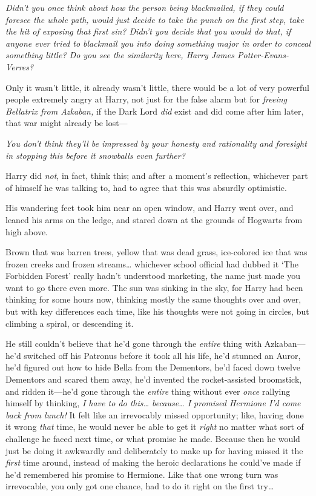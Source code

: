 \emph{Didn't you once think about how the person being blackmailed, if
they could foresee the whole path, would just decide to take the punch
on the first step, take the hit of exposing that first sin? Didn't you
decide that you would do that, if anyone ever tried to blackmail you
into doing something major in order to conceal something little? Do you
see the similarity here, Harry James Potter-Evans-Verres?}

Only it wasn't little, it already wasn't little, there would be a lot of
very powerful people extremely angry at Harry, not just for the false
alarm but for \emph{freeing Bellatrix from Azkaban,} if the Dark Lord
\emph{did} exist and did come after him later, that war might already be
lost---

\emph{You don't think they'll be impressed by your honesty and
rationality and foresight in stopping this before it snowballs even
further?}

Harry did \emph{not}, in fact, think this; and after a moment's
reflection, whichever part of himself he was talking to, had to agree
that this was absurdly optimistic.

His wandering feet took him near an open window, and Harry went over,
and leaned his arms on the ledge, and stared down at the grounds of
Hogwarts from high above.

Brown that was barren trees, yellow that was dead grass, ice-colored ice
that was frozen creeks and frozen streams\ldots{} whichever school
official had dubbed it `The Forbidden Forest' really hadn't understood
marketing, the name just made you want to go there even more. The sun
was sinking in the sky, for Harry had been thinking for some hours now,
thinking mostly the same thoughts over and over, but with key
differences each time, like his thoughts were not going in circles, but
climbing a spiral, or descending it.

He still couldn't believe that he'd gone through the \emph{entire} thing
with Azkaban---he'd switched off his Patronus before it took all his
life, he'd stunned an Auror, he'd figured out how to hide Bella from the
Dementors, he'd faced down twelve Dementors and scared them away, he'd
invented the rocket-assisted broomstick, and ridden it---he'd gone
through the \emph{entire} thing without ever \emph{once} rallying
himself by thinking, \emph{I have to do this\ldots{} because\ldots{} I
promised Hermione I'd come back from lunch!} It felt like an irrevocably
missed opportunity; like, having done it wrong \emph{that} time, he
would never be able to get it \emph{right} no matter what sort of
challenge he faced next time, or what promise he made. Because then he
would just be doing it awkwardly and deliberately to make up for having
missed it the \emph{first} time around, instead of making the heroic
declarations he could've made if he'd remembered his promise to
Hermione. Like that one wrong turn was irrevocable, you only got one
chance, had to do it right on the first try\ldots{}

